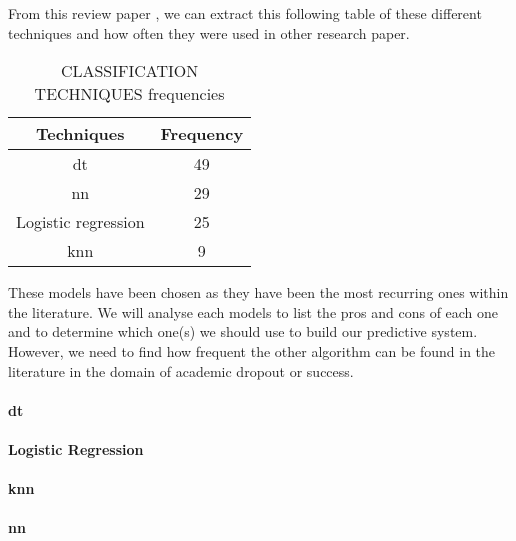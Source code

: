 \documentclass[../../main.tex]{subfiles}
\begin{document}
From this review paper \cite{agrusti_university_2019}, we can extract this following table of these different techniques and how often they were used in other research paper.
\begin{table}[H]
    \centering
    \caption{CLASSIFICATION TECHNIQUES frequencies\cite{agrusti_university_2019}}
    \begin{tabular}{|c|c|}
        \hline
        \textbf{Techniques} & \textbf{Frequency}\\
        \hline
        \acrlong{dt} & 49\\
        \hline
        \acrlong{nn} & 29\\
        \hline
        Logistic regression & 25\\
        \hline
        \acrshort{knn} & 9\\
        \hline
    \end{tabular}
    \label{tab:class_tech_freq_agrusti}
\end{table}
These models have been chosen as they have been the most recurring ones within the literature. We will analyse each models to list the pros and cons of each one and to determine which one(s) we should use to build our predictive system.
However, we need to find how frequent the other algorithm can be found in the literature in the domain of academic dropout or success.


\vspace{8pt}
\paragraph{\acrfull{dt}}


\vspace{8pt}
\paragraph{Logistic Regression}


\vspace{8pt}
\paragraph{\acrfull{knn}}


\vspace{8pt}
\paragraph{\acrfull{nn}}

\end{document}
